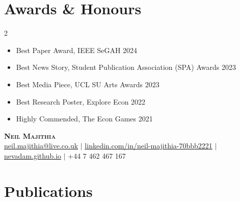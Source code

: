\documentclass[a4paper,10pt]{article}
\begin{document}
\section*{Awards \& Honours}
\setlength{\multicolsep}{0.15pt}
\begin{multicols}{2}
\begin{itemize}
    \item Best Paper Award, IEEE SeGAH 2024
    \item Best News Story, Student Publication Association (SPA) Awards 2023
    \item Best Media Piece, UCL SU Arts Awards 2023
    \item Best Research Poster, Explore Econ 2022
    \item Highly Commended, The Econ Games 2021
\end{itemize}
\end{multicols}

\newpage


\begin{center}
    {\LARGE \textsc{\color{squareone}\textbf{Neil Majithia}}} \\
    \href{mailto:neil.majithia@live.co.uk}{neil.majithia@live.co.uk} $\vert$ \href{https://www.linkedin.com/in/neil-majithia-70bbb2221/}{linkedin.com/in/neil-majithia-70bbb2221} $\vert$ \href{nevadam.github.io}{nevadam.github.io} $\vert$ +44 7 462 467 167
\end{center}

\vspace{1em}
\section*{Publications}
\vspace{-1em}
\hrulefill
\end{document}
